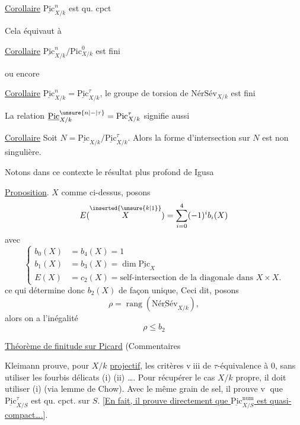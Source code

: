 \uline{Corollaire} $\underline{\mathrm{Pic}}^n_{X/k}$ est qu. cpct 

Cela équivaut à

\uline{Corollaire} $\underline{\mathrm{Pic}}^n_{X/k}/\mathrm{Pic}^0_{X/k}$ est fini

ou encore

\uline{Corollaire} $\underline{\mathrm{Pic}}^n_{X/k}=\underline{\mathrm{Pic}}^\tau_{X/k}$, le groupe de torsion  de $\text{NérSév}_{X/k}$ est fini

La relation $\underline{\mathrm{Pic}}^{\unsure{n|-|\tau}}_{X/k}=\mathrm{Pic}^\tau_{X/k}$ signifie aussi

\uline{Corollaire} Soit $N=\underline{\mathrm{Pic}}_{X/k}/\underline{\mathrm{Pic}}^\tau_{X/k}$. Alors la forme d'intersection sur $N$ est non singulière.

Notons dans ce contexte le résultat plus profond de Igusa

\uline{Proposition}. $X$ comme ci-dessus,  posons
\[
E(\overset{\inserted{\unsure{k|1}}}{X})=\sum_{i=0}^{4}(-1)^i b_i(X)
\]
avec
\[
\left\{\begin{aligned}
b_0(X)&=b_4(X)=1\\
b_1(X)&=b_3(X)=\dim\underline{\mathrm{Pic}}_X\\
E(X)&=c_2(X)=\text{self-intersection de la diagonale dans } X\times X.
\end{aligned}\right.
\]
ce qui détermine donc $b_2(X)$ de façon unique,  Ceci dit, posons
\[
\rho=\operatorname{rang}(\underline{\text{NérSév}}_{X/k}),
\]
alors on a l'inégalité
\[
\boxed{\rho\leq b_2}
\]

\uline{Théorème de finitude sur Picard} (Commentaires

Kleimann prouve, pour $X/k$ \uline{projectif}, les critères \textcircled{\scriptsize viii} de $\tau$-équivalence à $0$, sans utiliser les fourbis délicats (i) (ii) \ldots. Pour récupérer le cas $X/k$ propre, il doit utiliser (i) (via lemme de Chow). Avec le même grain de sel, il prouve \textcircled{\scriptsize v} que $\underline{\mathrm{Pic}}^\tau_{X/S}$ est qu. cpct. sur $S$. [\uline{En fait, il prouve directement que $\underline{\mathrm{Pic}}^{\mathrm{num}}_{X/S}$ est quasi-compact\ldots.}].

